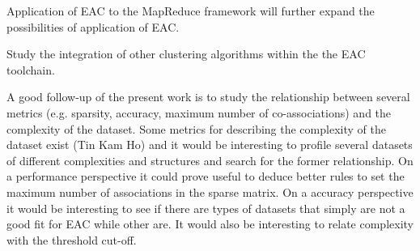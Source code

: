 Application of EAC to the MapReduce framework will further expand the possibilities of application of EAC.

Study the integration of other clustering algorithms within the the EAC toolchain.

A good follow-up of the present work is to study the relationship between several metrics (e.g. sparsity, accuracy, maximum number of co-associations) and the complexity of the dataset. Some metrics for describing the complexity of the dataset exist (Tin Kam Ho) and it would be interesting to profile several datasets of different complexities and structures and search for the former relationship.
On a performance perspective it could prove useful to deduce better rules to set the maximum number of associations in the sparse matrix.
On a accuracy perspective it would be interesting to see if there are types of datasets that simply are not a good fit for EAC while other are. It would also be interesting to relate complexity with the threshold cut-off.


\cleardoublepage

